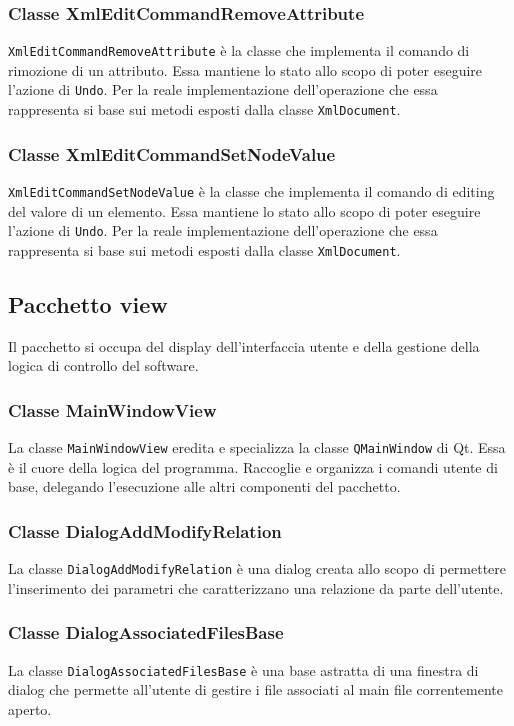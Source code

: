 	\subsubsection{Classe XmlEditCommandRemoveAttribute}
		\texttt{XmlEditCommandRemoveAttribute} è la classe che implementa il comando di rimozione di un attributo. Essa mantiene lo stato allo scopo di poter eseguire l'azione di \texttt{Undo}. Per la reale implementazione dell'operazione che essa rappresenta si base sui metodi esposti dalla classe \texttt{XmlDocument}.
		
	\subsubsection{Classe XmlEditCommandSetNodeValue}
		\texttt{XmlEditCommandSetNodeValue} è la classe che implementa il comando di editing del valore di un elemento. Essa mantiene lo stato allo scopo di poter eseguire l'azione di \texttt{Undo}. Per la reale implementazione dell'operazione che essa rappresenta si base sui metodi esposti dalla classe \texttt{XmlDocument}.

\subsection{Pacchetto view}
	Il pacchetto si occupa del display dell'interfaccia utente e della gestione della logica di controllo del software.
	
	\subsubsection{Classe MainWindowView}
		La classe \texttt{MainWindowView} eredita e specializza la classe \texttt{QMainWindow} di Qt\textregistered. Essa è il cuore della logica del programma. Raccoglie e organizza i comandi utente di base, delegando l'esecuzione alle altri componenti del pacchetto.
		
	\subsubsection{Classe DialogAddModifyRelation}
		La classe \texttt{DialogAddModifyRelation} è una dialog creata allo scopo di permettere l'inserimento dei parametri che caratterizzano una relazione da parte dell'utente.
		
	\subsubsection{Classe DialogAssociatedFilesBase}
		La classe \texttt{DialogAssociatedFilesBase} è una base astratta di una finestra di dialog che permette all'utente di gestire i file associati al main file correntemente aperto.
		
